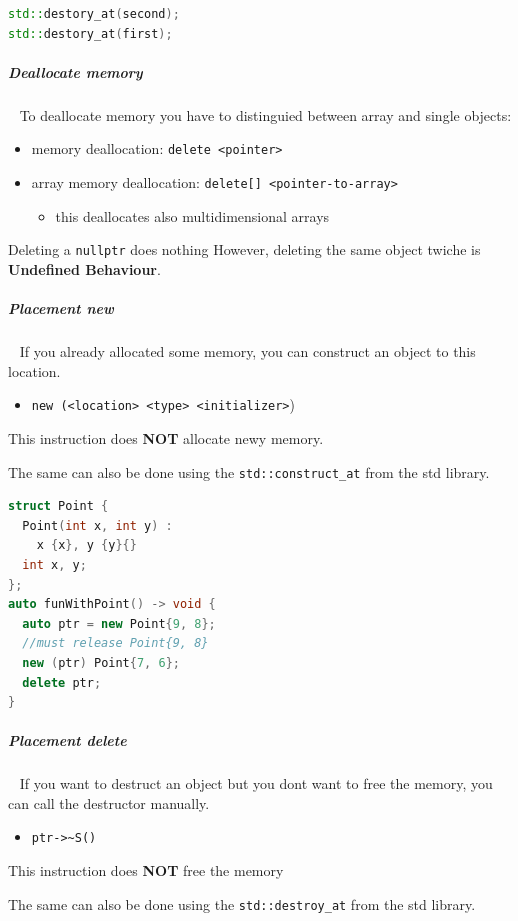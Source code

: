\documentclass[11pt,twoside,landscape]{article}
\begin{document}
\begin{multicols}{2}
\begin{lstlisting}[language=c++,label=lst:org38096ef,caption={Example for a non default constructible type on the heap},captionpos=b,numbers=none]
std::destory_at(second);
std::destory_at(first);
\end{lstlisting}

\subparagraph{Deallocate memory} \
\label{sec:orgfbd0e5d}
To deallocate memory you have to distinguied between array and single objects:
\begin{itemize}
\item memory deallocation: \texttt{delete <pointer>}
\item array memory deallocation: \texttt{delete[] <pointer-to-array>}
\begin{itemize}
\item this deallocates also multidimensional arrays
\end{itemize}
\end{itemize}


Deleting a \texttt{nullptr} does nothing
However, deleting the same object twiche is \textbf{Undefined Behaviour}.
\subparagraph{Placement new} \
\label{sec:org9cddd3c}
If you already allocated some memory, you can construct an object to this location.
\begin{itemize}
\item \texttt{new (<location> <type> <initializer>})
\end{itemize}

This instruction does \textbf{NOT} allocate newy memory.

The same can also be done using the \texttt{std::construct\_at} from the std library.




\begin{lstlisting}[language=c++,numbers=none]
struct Point {
  Point(int x, int y) :
    x {x}, y {y}{}
  int x, y;
};
auto funWithPoint() -> void {
  auto ptr = new Point{9, 8};
  //must release Point{9, 8}
  new (ptr) Point{7, 6};
  delete ptr;
}
\end{lstlisting}

\subparagraph{Placement delete} \
\label{sec:orgaa081c7}
If you want to destruct an object but you dont want to free the memory, you can call the destructor manually.
\begin{itemize}
\item \texttt{ptr->\textasciitilde{}S()}
\end{itemize}

This instruction does \textbf{NOT} free the memory

The same can also be done using the \texttt{std::destroy\_at} from the std library.



\end{multicols}
\end{document}
